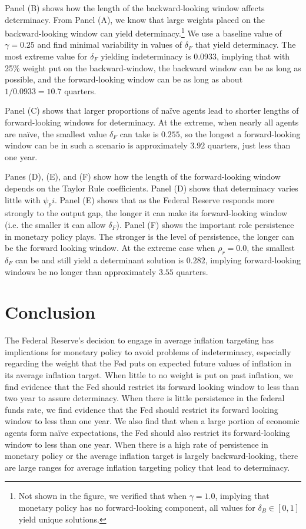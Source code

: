 \documentclass[english,authoryear,12pt]{elsarticle}
\begin{document}
Panel (B) shows how the length of the backward-looking window affects determinacy. From Panel (A), we know that large weights placed on the backward-looking window can yield determinacy.\footnote{Not shown in the figure, we verified that when $\gamma=1.0$, implying that monetary policy has no forward-looking component, all values for $\delta_B\in[0,1]$ yield unique solutions.} We use a baseline value of $\gamma=0.25$ and find minimal variability in values of $\delta_F$ that yield determinacy. The most extreme value for $\delta_F$ yielding indeterminacy is 0.0933, implying that with 25\% weight put on the backward-window, the backward window can be as long as possible, and the forward-looking window can be as long as about $1/0.0933 = 10.7$ quarters.

Panel (C) shows that larger proportions of na\"ive agents lead to shorter lengths of forward-looking windows for determinacy. At the extreme, when nearly all agents are na\"ive, the smallest value $\delta_F$ can take is $0.255$, so the longest a forward-looking window can be in such a scenario is approximately $3.92$ quarters, just less than one year.

Panes (D), (E), and (F) show how the length of the forward-looking window depends on the Taylor Rule coefficients. Panel (D) shows that determinacy varies little with $\psi_pi$. Panel (E) shows that as the Federal Reserve responds more strongly to the output gap, the longer it can make its forward-looking window (i.e. the smaller it can allow $\delta_F$). Panel (F) shows the important role persistence in monetary policy plays. The stronger is the level of persistence, the longer can be the forward looking window. At the extreme case when $\rho_r=0.0$, the smallest $\delta_F$ can be and still yield a determinant solution is $0.282$, implying forward-looking windows be no longer than approximately $3.55$ quarters.

\section{Conclusion}

The Federal Reserve's decision to engage in average inflation targeting has implications for monetary policy to avoid problems of indeterminacy, especially regarding the weight that the Fed puts on expected future values of inflation in its average inflation target. When little to no weight is put on past inflation, we find evidence that the Fed should restrict its forward looking window to less than two year to assure determinacy. When there is little persistence in the federal funds rate, we find evidence that the Fed should restrict its forward looking window to less than one year. We also find that when a large portion of economic agents form na\"ive expectations, the Fed should also restrict its forward-looking window to less than one year. When there is a high rate of persistence in monetary policy or the average inflation target is largely backward-looking, there are large ranges for average inflation targeting policy that lead to determinacy.



\end{document}
